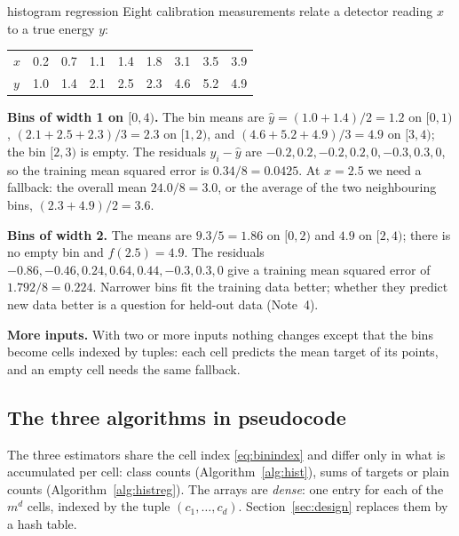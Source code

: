 \documentclass[11pt]{article}
\begin{document}
\begin{worked}{histogram regression}
Eight calibration measurements relate a detector reading $x$ to a true energy $y$:

\begin{center}\small
\begin{tabular}{@{}l*{8}{c}@{}}\toprule
$x$ & 0.2 & 0.7 & 1.1 & 1.4 & 1.8 & 3.1 & 3.5 & 3.9 \\
$y$ & 1.0 & 1.4 & 2.1 & 2.5 & 2.3 & 4.6 & 5.2 & 4.9 \\ \bottomrule
\end{tabular}
\end{center}

\textbf{Bins of width 1 on $[0, 4)$.} The bin means are $\hat y = (1.0 + 1.4)/2 = 1.2$ on $[0,1)$,
$(2.1 + 2.5 + 2.3)/3 = 2.3$ on $[1,2)$, and $(4.6 + 5.2 + 4.9)/3 = 4.9$ on $[3,4)$; the bin $[2,3)$ is empty. The
residuals $y_i - \hat y$ are $-0.2, 0.2, -0.2, 0.2, 0, -0.3, 0.3, 0$, so the training mean squared error is
$0.34/8 = 0.0425$. At $x = 2.5$ we need a fallback: the overall mean $24.0/8 = 3.0$, or the average of the two
neighbouring bins, $(2.3 + 4.9)/2 = 3.6$.

\textbf{Bins of width 2.} The means are $9.3/5 = 1.86$ on $[0, 2)$ and $4.9$ on $[2, 4)$; there is no empty bin and
$f(2.5) = 4.9$. The residuals $-0.86, -0.46, 0.24, 0.64, 0.44, -0.3, 0.3, 0$ give a training mean squared error of
$1.792/8 = 0.224$. Narrower bins fit the training data better; whether they predict new data better is a question for
held-out data (Note~4).

\textbf{More inputs.} With two or more inputs nothing changes except that the bins become cells indexed by tuples:
each cell predicts the mean target of its points, and an empty cell needs the same fallback.
\end{worked}

\subsection{The three algorithms in pseudocode}\label{sec:pseudo}

The three estimators share the cell index \eqref{eq:binindex} and differ only in what is accumulated per cell:
class counts (Algorithm~\ref{alg:hist}), sums of targets or plain counts (Algorithm~\ref{alg:histreg}). The arrays are \emph{dense}: one entry for each of the $m^d$ cells, indexed by the
tuple $(c_1, \dots, c_d)$. Section~\ref{sec:design} replaces them by a hash table.
\end{document}
